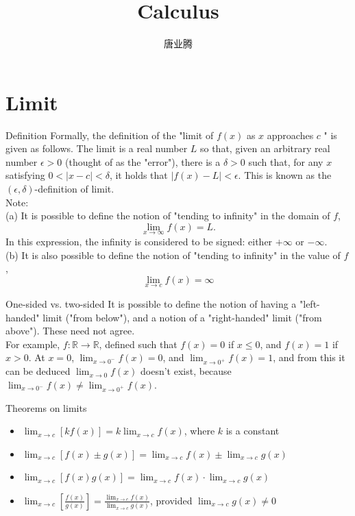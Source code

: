 \documentclass{beamer}
\title{Calculus}
\author{唐业腾}
\begin{document}
\maketitle
{}

\section{Limit}
\begin{frame}{Definition}
Formally, the definition of the "limit of $f(x)$ as $x$ approaches $c$ " is given as follows. The limit is a real number $L$ so that, given an arbitrary real number $\epsilon>0$ (thought of as the "error"), there is a $\delta>0$ such that, for any $x$ satisfying $0<|x-c|<\delta$, it holds that $|f(x)-L|<\epsilon$. This is known as the $(\epsilon, \delta)$-definition of limit.\\
Note:\\
(a) It is possible to define the notion of "tending to infinity" in the domain of $f$,
$$
\lim _{x \rightarrow \infty} f(x)=L .
$$
In this expression, the infinity is considered to be signed: either $+\infty$ or $-\infty$.\\
(b) It is also possible to define the notion of "tending to infinity" in the value of $f$,
$$
\lim _{x \rightarrow c} f(x)=\infty
$$
\end{frame}

\begin{frame}{One-sided vs. two-sided}
    It is possible to define the notion of having a "left-handed" limit ("from below"), and a notion of a "right-handed" limit ("from above"). These need not agree.\\
    For example, $f: \mathbb{R} \rightarrow \mathbb{R}$, defined such that $f(x)=0$ if $x \leq 0$, and $f(x)=1$ if $x>0$. At $x=0$, $\lim _{x \rightarrow 0^{-}} f(x)=0$, and $\lim _{x \rightarrow 0^{+}} f(x)=1$, and from this it can be deduced $\lim _{x \rightarrow 0} f(x)$ doesn't exist, because $\lim _{x \rightarrow 0^{-}} f(x) \neq \lim _{x \rightarrow 0^{+}} f(x)$.
\end{frame}

\begin{frame}{Theorems on limits}
    \begin{itemize}
        \item $\lim _{x \rightarrow c}[kf(x)]=k\lim _{x \rightarrow c} f(x)$, where $k$ is a constant
        \item $\lim _{x \rightarrow c}[f(x) \pm g(x)]=\lim _{x \rightarrow c} f(x) \pm \lim _{x \rightarrow c} g(x)$
        \item $\lim _{x \rightarrow c}[f(x) g(x)]=\lim _{x \rightarrow c} f(x) \cdot \lim _{x \rightarrow c} g(x)$
        \item $\lim _{x \rightarrow c}\left[\frac{f(x)}{g(x)}\right]=\frac{\lim _{x \rightarrow c} f(x)}{\lim _{x \rightarrow c} g(x)}$, provided $\lim _{x \rightarrow c} g(x) \neq 0$
    \end{itemize}
\end{frame}
\end{document}
